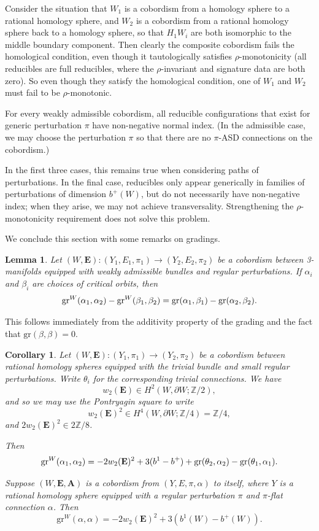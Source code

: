 \documentclass{memo-l}
\newtheorem{lemma}[theorem]{Lemma}
\newtheorem{corollary}[theorem]{Corollary}
\theoremstyle{definition}
\theoremstyle{remark}
\numberwithin{section}{chapter}
\numberwithin{equation}{chapter}
\begin{document}
Consider the situation that $W_1$ is a cobordism from a homology sphere to a rational homology sphere, and $W_2$ is a cobordism from a rational homology sphere back to a homology sphere, so that $H_1 W_i$ are both isomorphic to the middle boundary component. Then clearly the composite cobordism fails the homological condition, even though it tautologically satisfies $\rho$-monotonicity (all reducibles are full reducibles, where the $\rho$-invariant and signature data are both zero). So even though they satisfy the homological condition, one of $W_1$ and $W_2$ must fail to be $\rho$-monotonic. 

For every weakly admissible cobordism, all reducible configurations that exist for generic perturbation $\pi$ have non-negative normal index. (In the admissible case, we may choose the perturbation $\pi$ so that there are no $\pi$-ASD connections on the cobordism.)

In the first three cases, this remains true when considering paths of perturbations. In the final case, reducibles only appear generically in families of perturbations of dimension $b^+(W)$, but do not necessarily have non-negative index; when they arise, we may not achieve transversality. Strengthening the $\rho$-monotonicity requirement does not solve this problem.

We conclude this section with some remarks on gradings.

\begin{lemma}\label{cob-grading-rel}
Let $(W,\mathbf{E}): (Y_1,E_1,\pi_1) \to (Y_2, E_2,\pi_2)$ be a cobordism between 3-manifolds equipped with weakly admissible bundles and regular perturbations. If $\alpha_i$ and $\beta_i$ are choices of critical orbits, then $$\textup{gr}^W(\alpha_1, \alpha_2) - \textup{gr}^W(\beta_1, \beta_2) =  \textup{gr}(\alpha_1, \beta_1) - \textup{gr}(\alpha_2, \beta_2).$$
\end{lemma}
This follows immediately from the additivity property of the grading and the fact that $\text{gr}(\beta, \beta) = 0$.

\begin{corollary}\label{cob-grading-abs}Let $(W,\mathbf{E}): (Y_1, \pi_1) \to (Y_2, \pi_2)$ be a cobordism between rational homology spheres equipped with the trivial bundle and small regular perturbations. Write $\theta_i$ for the corresponding trivial connections. We have 
$$w_2(\mathbf{E}) \in H^2(W, \partial W;\mathbb Z/2),$$
and so we may use the Pontryagin square to write 
$$w_2(\mathbf{E})^2 \in H^4(W,\partial W;\mathbb Z/4) = \mathbb Z/4,$$ 
and $2w_2(\mathbf{E})^2 \in 2\mathbb Z/8$.

Then $$\textup{gr}^W(\alpha_1, \alpha_2) = -2w_2(\mathbf{E})^2  +3(b^1 - b^+) + \textup{gr}(\theta_2, \alpha_2) - \textup{gr}(\theta_1, \alpha_1).$$

Suppose $(W,\mathbf{E},\mathbf{A})$ is a cobordism from $(Y,E,\pi,\alpha)$ to itself, where $Y$ is a rational homology sphere equipped with a regular perturbation $\pi$ and $\pi$-flat connection $\alpha$. Then $$\text{gr}^W(\alpha, \alpha) = -2w_2(\mathbf{E})^2 + 3(b^1(W)-b^+(W)).$$
\end{corollary}
\end{document}
